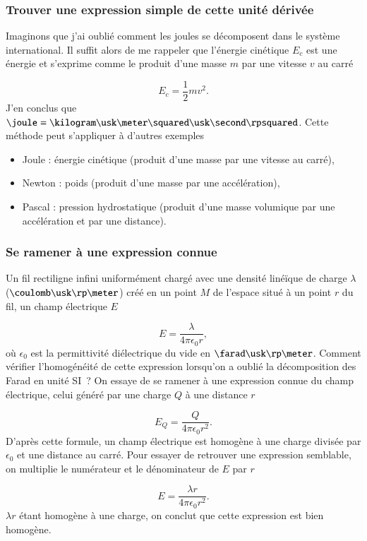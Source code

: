 \documentclass[12pt]{book}
\begin{document}
\subsubsection{Trouver une expression simple de cette unité dérivée}
Imaginons que j'ai oublié comment les joules se décomposent dans le système international.
Il suffit alors de me rappeler que l'énergie cinétique $E_c$ est une énergie et s'exprime
comme le produit d'une masse $m$ par une vitesse $v$ au carré

\begin{equation*}
	E_c = \dfrac{1}{2} m v^2.
\end{equation*}
J'en conclus que 
$\joule = \kilogram \usk \meter \squared \usk \second \rpsquared$. Cette méthode 
peut s'appliquer à d'autres exemples
\begin{itemize}
	\item Joule : énergie cinétique (produit d'une masse par une vitesse au carré),
	\item Newton : poids (produit d'une masse par une accélération),
	\item Pascal : pression hydrostatique (produit d'une masse volumique par une accélération et par une distance).
\end{itemize}

\subsubsection{Se ramener à une expression connue}
Un fil rectiligne infini uniformément chargé avec une densité linéïque de charge
$\lambda$ ($\coulomb \usk \rp \meter$) créé en un point $M$ de l'espace
situé à un point $r$ du fil, un champ électrique $E$

\begin{equation*}
	E = \dfrac{\lambda}{4 \pi \epsilon_0 r},
\end{equation*}
où $\epsilon_0$ est la permittivité diélectrique du vide en 
$\farad \usk \rp \meter$. Comment vérifier l'homogénéité de cette expression
lorsqu'on a oublié la décomposition des Farad en unité SI~? On essaye de se 
ramener à une expression connue du champ électrique, celui généré par une charge 
$Q$ à une distance $r$

\begin{equation*}
	E_Q = \dfrac{Q}{4 \pi \epsilon_0 r^2}.
\end{equation*}
D'après cette formule, un champ électrique est homogène à une charge divisée 
par $\epsilon_0$ et une distance au carré. Pour essayer de retrouver une expression
semblable, on multiplie le numérateur et le dénominateur de $E$ par $r$

\begin{equation*}
	E = \dfrac{\lambda r}{4 \pi \epsilon_0 r^2}.
\end{equation*}
$\lambda r$ étant homogène à une charge, on conclut que cette expression est 
bien homogène.
\end{document}
